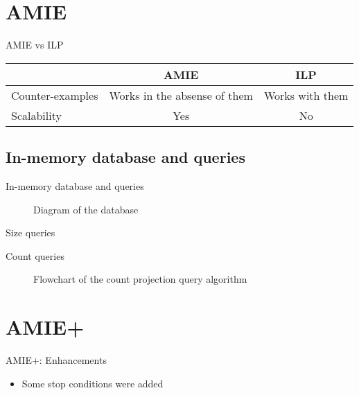 \documentclass[xcolor={x11names}]{beamer}
\begin{document}
\section{AMIE}
\begin{frame}{AMIE vs ILP}
    \begin{tabular}{ l | c | c }
        \toprule
        & AMIE & ILP \\
        \midrule
        Counter-examples & Works in the absense of them & Works with them \\
        Scalability      & Yes  & No\\
        \bottomrule
    \end{tabular}
\end{frame}

\subsection{In-memory database and queries}

\begin{frame}{In-memory database and queries}
\begin{figure}
    
\caption{Diagram of the database}
\label{fig:db}
\end{figure}
\end{frame}

\begin{frame}{Size queries}
\end{frame}

\begin{frame}{Count queries}
    \begin{figure}
    \resizebox{!}{0.75\textheight}{%
        
    }
    \caption{Flowchart of the count projection query algorithm}
    \label{fig:count_projection}
\end{figure}
\end{frame}

\section{AMIE+}
\begin{frame}{AMIE+: Enhancements}
	\begin{itemize}
   		\item Some stop conditions were added 
	\end{itemize}
\end{frame}
\end{document}
